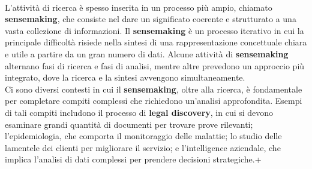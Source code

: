 \documentclass{report}
\begin{document}
	\vspace{\baselineskip}\\
	L'attività di ricerca è spesso inserita in un processo più ampio, chiamato \textbf{sensemaking}, che consiste nel dare un significato coerente e strutturato a una vasta collezione di informazioni. Il \textbf{sensemaking} è un processo iterativo in cui la principale difficoltà risiede nella sintesi di una rappresentazione concettuale chiara e utile a partire da un gran numero di dati. Alcune attività di \textbf{sensemaking} alternano fasi di ricerca e fasi di analisi, mentre altre prevedono un approccio più integrato, dove la ricerca e la sintesi avvengono simultaneamente.
	\vspace{\baselineskip}\\
	Ci sono diversi contesti in cui il \textbf{sensemaking}, oltre alla ricerca, è fondamentale per completare compiti complessi che richiedono un'analisi approfondita. Esempi di tali compiti includono il processo di \textbf{legal discovery}, in cui si devono esaminare grandi quantità di documenti per trovare prove rilevanti; l'epidemiologia, che comporta il monitoraggio delle malattie; lo studio delle lamentele dei clienti per migliorare il servizio; e l'intelligence aziendale, che implica l'analisi di dati complessi per prendere decisioni strategiche.+
	
\end{document}
